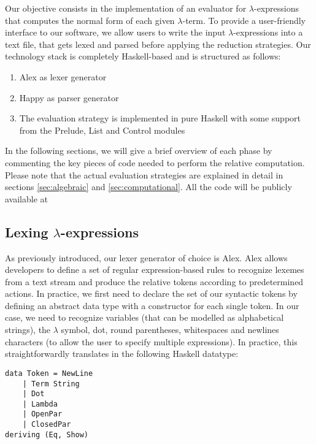 \documentclass{article}
\begin{document}
Our objective consists in the implementation of an evaluator for $\lambda$-expressions that computes the normal form of each given $\lambda$-term. To provide a user-friendly interface to our software, we allow users to write the input $\lambda$-expressions into a text file, that gets lexed and parsed before applying the reduction strategies. Our technology stack is completely Haskell-based and is structured as follows:

\begin{enumerate}
    \item Alex \cite{alex} as lexer generator
    \item Happy \cite{happy} as parser generator
    \item The evaluation strategy is implemented in pure Haskell with some support from the Prelude, List and Control modules
\end{enumerate}

In the following sections, we will give a brief overview of each phase by commenting the key pieces of code needed to perform the relative computation. Please note that the actual evaluation strategies are explained in detail in sections \ref{sec:algebraic} and \ref{sec:computational}. All the code will be publicly available at \cite{denis}

\subsection{Lexing $\lambda$-expressions} \label{sec:lexing}

As previously introduced, our lexer generator of choice is Alex. Alex allows developers to define a set of regular expression-based rules to recognize lexemes from a text stream and produce the relative tokens according to predetermined actions. In practice, we first need to declare the set of our syntactic tokens by defining an abstract data type with a constructor for each single token. In our case, we need to recognize variables (that can be modelled as alphabetical strings), the $\lambda$ symbol, dot, round parentheses, whitespaces and newlines characters (to allow the user to specify multiple expressions). In practice, this straightforwardly translates in the following Haskell datatype:

\begin{lstlisting}
data Token = NewLine
    | Term String
    | Dot
    | Lambda
    | OpenPar
    | ClosedPar
deriving (Eq, Show)
\end{lstlisting}
\end{document}

